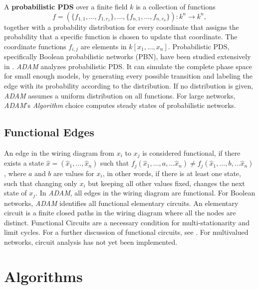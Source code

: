 \documentclass[10pt]{bmc_article}
\newenvironment{bmcformat}{\fussy\setboolean{publ}{true}}{\fussy}
\begin{document}
\begin{bmcformat}
A {\bf probabilistic PDS} over a finite field $k$ is a collection of functions
$$f = (\{f_{1,1}, \ldots, f_{1, r_1}\}, \ldots, \{f_{n, 1}, \ldots, f_{n, r_n}
\}) : k^n \rightarrow k^n,$$
together with a probability distribution for every coordinate that assigns the
probability that a specific function is chosen to update that coordinate.
The coordinate functions $f_{i,j}$ are elements in $k[x_1, \ldots , x_n]$.
Probabilistic PDS, specifically Boolean probabilistic networks (PBN), have been studied
extensively in \cite{shmulevich}.
{\it ADAM} analyzes probabilistic PDS. It can simulate the
complete phase space for small enough models, by generating every possible
transition and labeling the edge with its probability according to the
distribution. If no distribution is given, {\it ADAM} assumes a uniform distribution
on all functions. For large networks, {\it ADAM}'s {\it Algorithm} choice computes
steady states of probabilistic networks.
\subsection{Functional Edges} \label{sec:func}
An edge in the wiring diagram from $x_i$ to $x_j$ is considered
functional, if there exists a state $\hat x = (\hat x_1,  \ldots, \hat x_n)$ such
that $f_j( \hat x_1,  \ldots, a, \ldots \hat x_n) \neq f_j(\hat x_1, \ldots, b, \ldots
\hat x_n)$, where $a$ and $b$ are values for $x_i$, in other words, if there
is at least one state, such that changing only $x_i$ but keeping all other
values fixed, changes the next state of $x_j$.
In {\it ADAM}, all edges in the wiring diagram are functional.
For Boolean networks, {\it ADAM} identifies all functional elementary circuits. An elementary circuit is a finite closed paths in the wiring diagram where all the nodes are distinct. Functional Circuits are a necessary condition for multi-stationarity and limit cycles. For a further discussion of
functional circuits, see \cite{Chaouiya}. For multivalued networks, circuit analysis has not yet been implemented.
\section{Algorithms}

\end{bmcformat}
\end{document}
